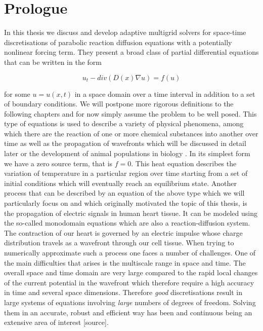 \documentclass[../draft_1.tex]{subfiles}
\begin{document}
\chapter{Prologue}

In this thesis we  discuss and develop adaptive multigrid solvers for space-time discretisations of parabolic reaction diffusion equations with a potentially nonlinear forcing term. They present a broad class of partial differential equations that can be written in the form
\begin{ceqn}
\begin{equation}
u_t - div ( D(x) \nabla u) = f(u)
\end{equation}
\end{ceqn}
for some $u = u(x,t)$ in a space domain over a time interval in addition to a set of boundary conditions. We will postpone more rigorous definitions to the following chapters and for now simply assume the problem to be well posed. This type of equations is used to describe a variety of physical phenomena, among which there are the reaction of one or more chemical substances into another over time as well as the propagation of wavefronts \cite{zegeling2004adaptive} which will be discussed in detail later or the development of animal populations in biology \cite{cosner2008reaction}. In its simplest form we have a zero source term, that is $f = 0$. This heat equation describes the variation of temperature in a particular region over time starting from a set of initial conditions which will eventually reach an equilibrium state.
Another process that can be described by an equation of the above type which we will particularly focus on and which originally motivated the topic of this thesis, is the propagation of electric signals in human heart tissue. It can be modeled using the so-called monodomain equations which are also a reaction-diffusion system. The contraction of our heart is governed by an electric impulse whose charge distribution travels as a wavefront through our cell tissue. When trying to numerically approximate such a process one faces a number of challenges. One of the main difficulties that arises is the multiscale range in space and time. The overall space and time domain are very large compared to the rapid local changes of the current potential in the wavefront which therefore require a high accuracy in time and several space dimensions. Therefore \textit{good} discretisations result in large systems of equations involving \textit{large} numbers of degrees of freedom. Solving them in an accurate, robust and efficient way has been and continuous being an extensive area of interest [source]. 
\end{document}

